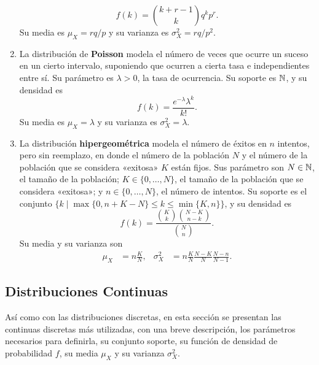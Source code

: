 \begin{enumerate}
	\[f(k) = \binom{k + r - 1}{k} q^k p^{r}.\]
	Su media es \(\mu_X = rq / p\) y su varianza es \(\sigma^2_X = rq / p^2\).
	\item La distribución de \textbf{Poisson} modela el número de veces que ocurre un suceso en un cierto intervalo, suponiendo que ocurren a cierta tasa e independientes entre sí. Su parámetro es \(\lambda > 0\), la tasa de ocurrencia. Su soporte es \(\mathbb{N}\), y su densidad es
	\[f(k) = \frac{e^{-\lambda} \lambda^k}{k!}.\]
	Su media es \(\mu_X = \lambda\) y su varianza es \(\sigma^2_X = \lambda\).
	\item La distribución \textbf{hipergeométrica} modela el número de éxitos en \(n\) intentos, pero sin reemplazo, en donde el número de la población \(N\) y el número de la población que se considera «exitosa» \(K\) están fijos. Sus parámetro son \(N \in \mathbb{N}\), el tamaño de la población; \(K \in \{0, \dotsc, N\}\), el tamaño de la población que se considera «exitosa»; y \(n \in \{0, \dotsc, N\}\), el número de intentos. Su soporte es el conjunto \(\{k \mid \max\{0, n+K-N\} \leq k \leq \min\{K, n\}\}\), y su densidad es
	\[f(k) = \frac{\binom{K}{k} \binom{N-K}{n-k}}{\binom{N}{n}}.\]
	Su media y su varianza son
	\begin{align*}
		\mu_X		&= n\frac{K}{N},	& \sigma^2_X	&= n\frac{K}{N} \frac{N-K}{N} \frac{N-n}{N-1}.
	\end{align*}
\end{enumerate}

\subsection{Distribuciones Continuas}

Así como con las distribuciones discretas, en esta sección se presentan las continuas discretas más utilizadas, con una breve descripción, los parámetros necesarios para definirla, su conjunto soporte, su función de densidad de probabilidad \(f\), su media \(\mu_X\) y su varianza \(\sigma^2_X\).

